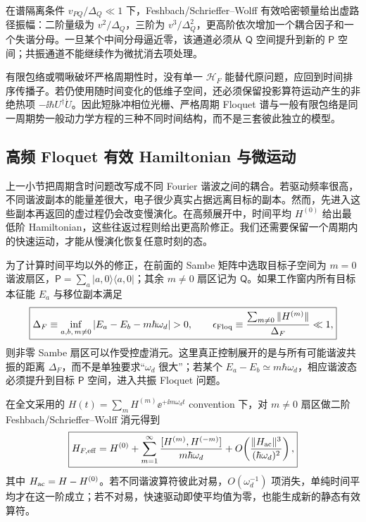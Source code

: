 在谱隔离条件 $v_{PQ}/\Delta_Q\ll1$ 下，Feshbach/Schrieffer--Wolff 有效哈密顿量给出虚路径振幅：二阶量级为 $v^2/\Delta_Q$，三阶为 $v^3/\Delta_Q^2$，更高阶依次增加一个耦合因子和一个失谐分母。一旦某个中间分母逼近零，该通道必须从 $\mathsf Q$ 空间提升到新的 $\mathsf P$ 空间；共振通道不能继续作为微扰消去项处理。

有限包络或啁啾破坏严格周期性时，没有单一 $\mathcal H_F$ 能替代原问题，应回到时间排序传播子。若仍使用随时间变化的低维子空间，还必须保留投影算符运动产生的非绝热项 $-\ii\hbar U^\dagger\dot U$。因此短脉冲相位光栅、严格周期 Floquet 谱与一般有限包络是同一周期势一般动力学方程的三种不同时间结构，而不是三套彼此独立的模型。

\subsection{高频 Floquet 有效 Hamiltonian 与微运动}

上一小节把周期含时问题改写成不同 Fourier 谐波之间的耦合。若驱动频率很高，不同谐波副本的能量差很大，电子很少真实占据远离目标的副本。然而，先进入这些副本再返回的虚过程仍会改变慢演化。在高频展开中，时间平均 $H^{(0)}$ 给出最低阶 Hamiltonian，这些往返过程则给出更高阶修正。我们还需要保留一个周期内的快速运动，才能从慢演化恢复任意时刻的态。

为了计算时间平均以外的修正，在前面的 Sambe 矩阵中选取目标子空间为 $m=0$ 谐波扇区，$\mathsf P=\sum_a|a,0\rangle\langle a,0|$；其余 $m\neq0$ 扇区记为 $\mathsf Q$。如果工作窗内所有目标本征能 $E_a$ 与移位副本满足
\begin{equation}
\boxed{
\Delta_F
\equiv
\inf_{a,b,\,m\neq0}
|E_a-E_b-m\hbar\omega_d|>0,
\qquad
\epsilon_{\rm Floq}
\equiv
\frac{\sum_{m\neq0}\|H^{(m)}\|}{\Delta_F}\ll1,}
\label{eq:floquet_high_frequency_gap_control}
\end{equation}
则非零 Sambe 扇区可以作受控虚消元。这里真正控制展开的是与所有可能谐波共振的距离 $\Delta_F$，而不是单独要求“$\omega_d$ 很大”；若某个 $E_a-E_b\simeq m\hbar\omega_d$，相应谐波态必须提升到目标 $\mathsf P$ 空间，进入共振 Floquet 问题。

在全文采用的 $H(t)=\sum_mH^{(m)}\ee^{+\ii m\omega_dt}$ convention 下，对 $m\neq0$ 扇区做二阶 Feshbach/Schrieffer--Wolff 消元得到
\begin{equation}
\boxed{
H_{F,\rm eff}
=H^{(0)}
+\sum_{m=1}^{\infty}
\frac{[H^{(m)},H^{(-m)}]}{m\hbar\omega_d}
+O\!\left(\frac{\|H_{\rm ac}\|^3}{(\hbar\omega_d)^2}\right),}
\label{eq:floquet_van_vleck_first_order_our_convention}
\end{equation}
其中 $H_{\rm ac}=H-H^{(0)}$。若不同谐波算符彼此对易，$O(\omega_d^{-1})$ 项消失，单纯时间平均才在这一阶成立；若不对易，快速驱动即使平均值为零，也能生成新的静态有效算符。

